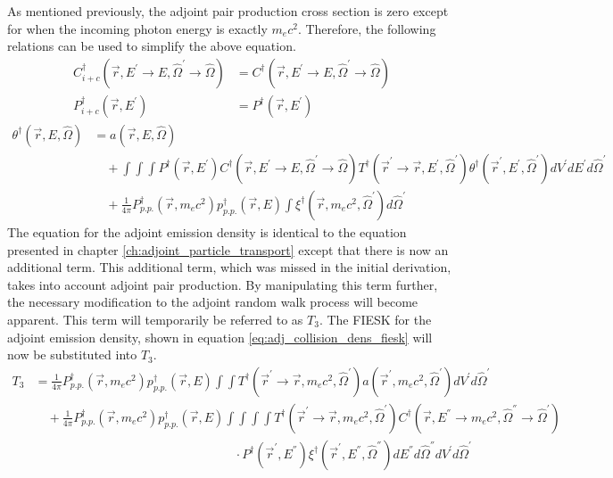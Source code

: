 As mentioned previously, the adjoint pair production cross section is zero 
except for when the incoming photon energy is exactly $m_ec^2$. Therefore, the 
following relations can be used to simplify the above equation. 
\begin{align}
  C_{i+c}^{\dagger}(\vec{r},E^{'} \to E, \hat{\Omega}^{'} \to \hat{\Omega}) & = 
  C^{\dagger}(\vec{r},E^{'} \to E, \hat{\Omega}^{'} \to \hat{\Omega}) \\
  P_{i+c}^{\dagger}(\vec{r},E^{'}) & = P^{\dagger}(\vec{r},E^{'})
\end{align}
\begin{align}
  \theta^{\dagger}(\vec{r},E,\hat{\Omega}) & = a(\vec{r},E,\hat{\Omega})
  \nonumber \\
  & \quad + \int\int\int P^{\dagger}(\vec{r},E^{'})
  C^{\dagger}(\vec{r},E^{'} \to E, \hat{\Omega}^{'} \to \hat{\Omega})
  T^{\dagger}(\vec{r}^{'} \to \vec{r},E^{'},\hat{\Omega}^{'})
    \theta^{\dagger}(\vec{r}^{'},E^{'},\hat{\Omega}^{'})
    dV^{'} dE^{'} d\hat{\Omega}^{'} \nonumber \\
  & \quad + \frac{1}{4\pi}P_{p.p.}^{\dagger}(\vec{r},m_ec^2)
  p_{p.p.}^{\dagger}(\vec{r},E)
  \int \xi^{\dagger}(\vec{r},m_ec^2,\hat{\Omega}^{'}) d\hat{\Omega}^{'}
  \nonumber 
\end{align}
The equation for the adjoint emission density is identical to the equation
presented in chapter \ref{ch:adjoint_particle_transport} except that there is
now an additional term. This additional term, which was missed in the initial
derivation, takes into account adjoint pair production. By manipulating this 
term further, the necessary modification to the adjoint random walk process
will become apparent. This term will temporarily be referred to as  $T_3$. 
The FIESK for the adjoint emission density, shown in equation 
\ref{eq:adj_collision_dens_fiesk} will now be substituted into $T_3$.
\begin{align}
  T_3 & = \frac{1}{4\pi}P_{p.p.}^{\dagger}(\vec{r},m_ec^2)
  p_{p.p.}^{\dagger}(\vec{r},E) 
  \int\int T^{\dagger}(\vec{r}^{'} \to \vec{r},m_ec^2,\hat{\Omega}^{'})
  a(\vec{r}^{'},m_ec^2,\hat{\Omega}^{'}) dV^{'}d\hat{\Omega}^{'} \nonumber \\
  & \quad + \frac{1}{4\pi}P_{p.p.}^{\dagger}(\vec{r},m_ec^2)
  p_{p.p.}^{\dagger}(\vec{r},E) \int\int\int\int
  T^{\dagger}(\vec{r}^{'} \to \vec{r},m_ec^2,\hat{\Omega}^{'})
  C^{\dagger}(\vec{r},E^{''} \to m_ec^2, \hat{\Omega}^{''} \to \hat{\Omega}^{'})
  \nonumber \\
  & \qquad \qquad \qquad \qquad \qquad \qquad \qquad \qquad \cdot
  P^{\dagger}(\vec{r}^{'},E^{''}) \xi^{\dagger}(\vec{r}^{'},E^{''},\hat{\Omega}^{''}) 
  dE^{''}d\hat{\Omega}^{''}dV^{'}d\hat{\Omega}^{'}
  \nonumber 
\end{align}
